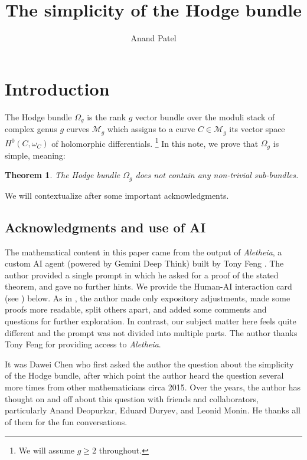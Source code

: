 \documentclass[reqno]{amsart}
\title{The simplicity of the Hodge bundle}
\author{Anand Patel}
\theoremstyle{plain}
\newtheorem{theorem}{Theorem}[section]
\newcommand{\Aletheia}{\emph{Aletheia}}
\newcommand{\M}{\mathscr{M}}
\begin{document}
\maketitle

\section{Introduction}


The Hodge bundle $\Omega_{g}$ is the rank $g$ vector bundle
over the moduli stack of complex genus $g$ curves $\M_{g}$  which assigns to a
curve $C \in \M_{g}$ its
vector space $H^{0}(C,\omega_{C})$ of holomorphic differentials.  \footnote{We will assume
$g \geq 2$ throughout.} In this note,
we prove that $\Omega_{g}$ is simple, meaning:

\begin{theorem}
  \label{theorem:main} The Hodge bundle $\Omega_{g}$ does not contain any
  non-trivial sub-bundles.
\end{theorem} 

 
We will contextualize  after some
important acknowledgments.


\subsection{Acknowledgments and use of AI} The mathematical content in this paper came from
the output of \Aletheia, a custom AI agent (powered by Gemini Deep Think) built by Tony Feng \cite{feng2026towards}.  The author provided a
single prompt in which he asked for a proof of the stated theorem, and gave
no further hints. We provide the Human-AI interaction card (see \cite{feng2026towards}) below. As in
\cite{feng2026eigenweights},  the author made only expository adjustments, made
some proofs more readable, split others apart, and added some comments and questions
for further exploration.  In contrast, our subject matter here feels quite different and the prompt was not divided into multiple parts.  The author thanks Tony Feng for providing access to \Aletheia. 

It was Dawei Chen who first asked the author the
question about the simplicity of the Hodge bundle, after which point the author heard the
question several more times from other mathematicians circa 2015. Over the
years, the author has thought on and off about this question with friends and collaborators, particularly Anand Deopurkar, Eduard
Duryev, and Leonid Monin.  He thanks all of them for the fun conversations.  
\end{document}
